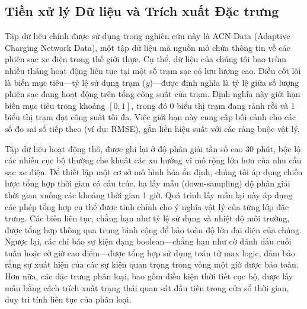 \documentclass[pdflatex,sn-mathphys-num]{sn-jnl}%
\theoremstyle{thmstyleone}%
\theoremstyle{thmstyletwo}%
\theoremstyle{thmstylethree}%
\begin{document}
\subsection{Tiền xử lý Dữ liệu và Trích xuất Đặc trưng}\label{subsec2_1}

Tập dữ liệu chính được sử dụng trong nghiên cứu này là ACN-Data (Adaptive Charging Network Data), một tập dữ liệu mã nguồn mở chứa thông tin về các phiên sạc xe điện trong thế giới thực. Cụ thể, dữ liệu của chúng tôi bao trùm nhiều tháng hoạt động liên tục tại một số trạm sạc có lưu lượng cao. Điều cốt lõi là biến mục tiêu---tỷ lệ sử dụng trạm ($y$)---được định nghĩa là tỷ lệ giữa số lượng phiên sạc đang hoạt động trên tổng công suất của trạm. Định nghĩa này giới hạn biến mục tiêu trong khoảng $[0, 1]$, trong đó 0 biểu thị trạm đang rảnh rỗi và 1 biểu thị trạm đạt công suất tối đa. Việc giới hạn này cung cấp bối cảnh cho các số đo sai số tiếp theo (ví dụ: RMSE), gắn liền hiệu suất với các ràng buộc vật lý. 

Tập dữ liệu hoạt động thô, được ghi lại ở độ phân giải tần số cao 30 phút, bộc lộ các nhiễu cục bộ thường che khuất các xu hướng vĩ mô rộng lớn hơn của nhu cầu sạc xe điện. Để thiết lập một cơ sở mô hình hóa ổn định, chúng tôi áp dụng chiến lược tổng hợp thời gian có cấu trúc, hạ lấy mẫu (down-sampling) độ phân giải thời gian xuống các khoảng thời gian 1 giờ. Quá trình lấy mẫu lại này áp dụng các phép tổng hợp cụ thể được tinh chỉnh cho ý nghĩa vật lý của từng lớp đặc trưng. Các biến liên tục, chẳng hạn như tỷ lệ sử dụng và nhiệt độ môi trường, được tổng hợp thông qua trung bình cộng để bảo toàn độ lớn đại diện của chúng. Ngược lại, các chỉ báo sự kiện dạng boolean---chẳng hạn như cờ đánh dấu cuối tuần hoặc cờ giờ cao điểm---được tổng hợp sử dụng toán tử max logic, đảm bảo rằng sự xuất hiện của các sự kiện quan trọng trong vòng một giờ được bảo toàn. Hơn nữa, các đặc trưng phân loại, bao gồm điều kiện thời tiết cục bộ, được lấy mẫu bằng cách trích xuất trạng thái quan sát đầu tiên trong cửa sổ thời gian, duy trì tính liên tục của phân loại.
\end{document}
